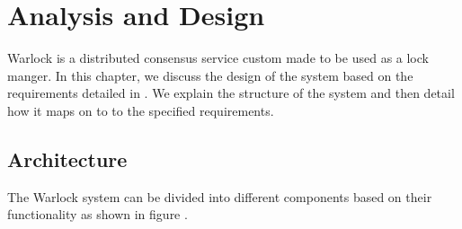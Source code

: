 \chapter{Analysis and Design}
\label{chapter:analysis.design}

Warlock is a distributed consensus service custom made to be used as a
lock manger. In this chapter, we discuss the design of the system based on the 
requirements detailed in . We explain the structure 
of the system and then detail how it maps on to to the specified requirements.

\section{Architecture}

The Warlock system can be divided into different components based on their
functionality as shown in figure .

